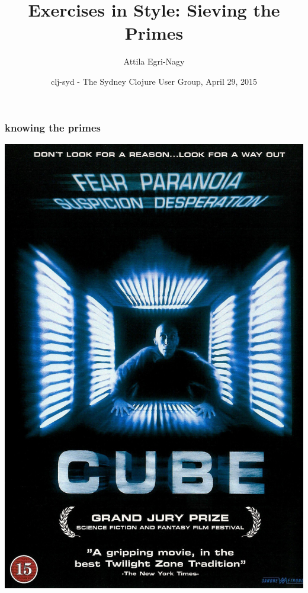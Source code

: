 \documentclass{beamer}
\begin{document}
\title[prime-sieves]{Exercises in Style: Sieving the Primes}
\author[e-n@]{Attila Egri-Nagy}
\date[(nth clj-syd 29)]{clj-syd - The Sydney Clojure User Group, April 29, 2015}

\maketitle

\begin{frame}\frametitle{knowing the primes}
\begin{center}
\includegraphics[height=\textheight]{CubeMovie.jpg}
\end{center}
\end{frame}
\end{document}
